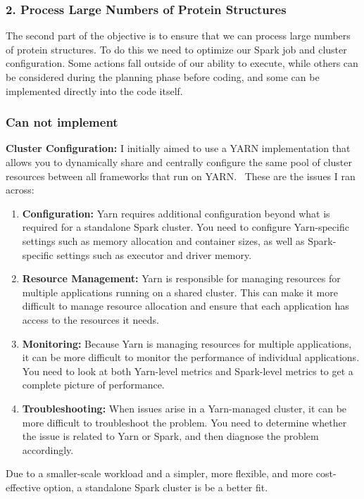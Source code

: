 \documentclass[]{final_report}
\begin{document}
\subsubsection{2. Process Large Numbers of Protein Structures}

The second part of the objective is to ensure that we can process large numbers of protein structures. To do this we need to optimize our Spark job and cluster configuration. Some actions fall outside of our ability to execute, while others can be considered during the planning phase before coding, and some can be implemented directly into the code itself.

\subsubsection{Can not implement}
\textbf{Cluster Configuration:} I initially aimed to use a YARN implementation that allows you to dynamically share and centrally configure the same pool of cluster resources between all frameworks that run on YARN.~\cite{goyal_spark_2018} These are the issues I ran across:

\begin{enumerate}
    \item \textbf{Configuration:} Yarn requires additional configuration beyond what is required for a standalone Spark cluster. You need to configure Yarn-specific settings such as memory allocation and container sizes, as well as Spark-specific settings such as executor and driver memory.
    \item \textbf{Resource Management:} Yarn is responsible for managing resources for multiple applications running on a shared cluster. This can make it more difficult to manage resource allocation and ensure that each application has access to the resources it needs.
    \item \textbf{Monitoring:} Because Yarn is managing resources for multiple applications, it can be more difficult to monitor the performance of individual applications. You need to look at both Yarn-level metrics and Spark-level metrics to get a complete picture of performance.
    \item \textbf{Troubleshooting:} When issues arise in a Yarn-managed cluster, it can be more difficult to troubleshoot the problem. You need to determine whether the issue is related to Yarn or Spark, and then diagnose the problem accordingly.
\end{enumerate}

Due to a smaller-scale workload and a simpler, more flexible, and more cost-effective option, a standalone Spark cluster is be a better fit.
\end{document}
